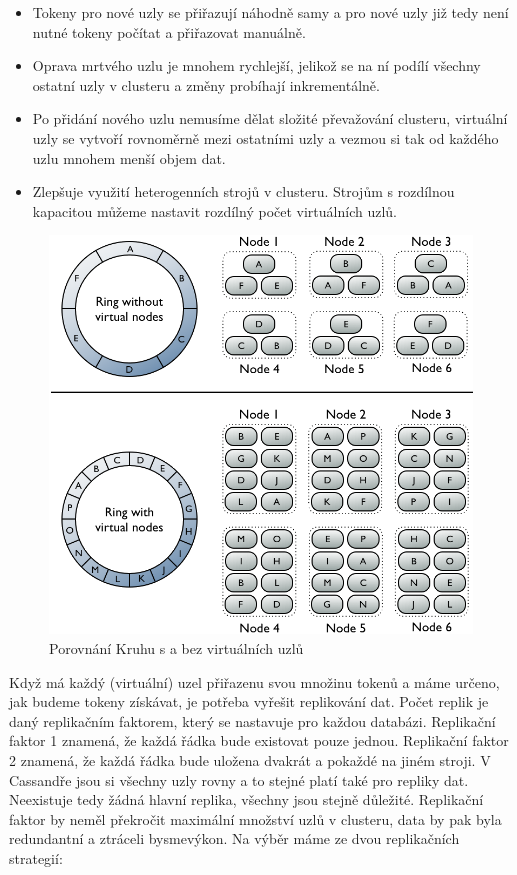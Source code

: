 \begin{itemize}
\item Tokeny pro nové uzly se přiřazují náhodně samy a pro nové uzly již tedy není nutné tokeny počítat a přiřazovat manuálně.
\item Oprava mrtvého uzlu je mnohem rychlejší, jelikož se na ní podílí všechny ostatní uzly v clusteru a změny probíhají inkrementálně.
\item Po přidání nového uzlu nemusíme dělat složité převažování clusteru, virtuální uzly se vytvoří rovnoměrně mezi ostatními uzly a vezmou si tak od každého uzlu mnohem menší objem dat.
\item Zlepšuje využití heterogenních strojů v clusteru. Strojům s rozdílnou kapacitou můžeme nastavit rozdílný počet virtuálních uzlů.
\end{itemize}

\begin{figure}[h]
\centering
\includegraphics[scale=0.5]{images/vnodes_compare}
\caption{Porovnání Kruhu s a bez virtuálních uzlů}
\label{fig:vnodes}
\end{figure}

Když má každý (virtuální) uzel přiřazenu svou množinu tokenů a máme určeno, jak budeme tokeny získávat, je potřeba vyřešit replikování dat. Počet replik je daný replikačním faktorem, který se nastavuje pro každou databázi. Replikační faktor 1 znamená, že každá řádka bude existovat pouze jednou. Replikační faktor 2 znamená, že každá řádka bude uložena dvakrát a pokaždé na jiném stroji. V Cassandře jsou si všechny uzly rovny a to stejné platí také pro repliky dat. Neexistuje tedy žádná hlavní replika, všechny jsou stejně důležité. Replikační faktor by neměl překročit maximální množství uzlů v clusteru, data by pak byla redundantní a ztráceli bysmevýkon. Na výběr máme ze dvou replikačních strategií:


